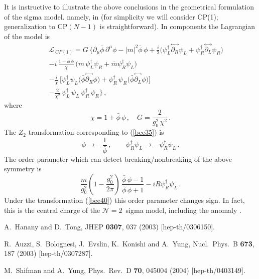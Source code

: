\documentclass[epsfig,12pt]{article}
\def\beq{\begin{equation}}
\def\eeq{\end{equation}}
\def\beqn{\begin{eqnarray}}
\def\eeqn{\end{eqnarray}}
\newcommand{\ntwo}{${\mathcal N}=2\,$}
\def\beqn{\begin{eqnarray}}
\def\eeqn{\end{eqnarray}}
\def\beq{\begin{equation}}
\def\eeq{\end{equation}}
\begin{document}
{It is instructive to illustrate the above conclusions
in  the geometrical  formulation of the sigma model. namely, in
(for simplicity we will consider CP(1); generalization to CP$(N-1)$ is straightforward).
In components the Lagrangian of the model is
\beqn
&&
{\mathcal L}_{\,  CP(1)}= G\, \Big\{
\partial_\mu \bar{\phi}\, \partial^\mu\phi -|m|^2{\bar{\phi}\,\phi} 
+\frac{i}{2}\big(\psi_L^\dagger\!\stackrel{\leftrightarrow}{\partial_R}\!\psi_L 
+ \psi_R^\dagger\!\stackrel{\leftrightarrow}{\partial_L}\!\psi_R
\big)
\nonumber\\[1mm] 
&&
-i\,\frac{1-\bar{\phi}\,\phi}{\chi} \,\big(m\,\psi_L^\dagger \psi_R + \bar m
\psi_R^\dagger \psi_L
\big)
\nonumber\\[1mm] 
&&
-\frac{i}{\chi}\,  \big[\psi_L^\dagger \psi_L
\big(\bar{\phi} \!\stackrel{\leftrightarrow}{\partial_R}\!\phi
\big)+ \psi_R^\dagger\, \psi_R
\big(\bar{\phi}\!\stackrel{\leftrightarrow}{\partial_L}\!\phi
\big)
\big]
\nonumber\\[1mm]
&&
-
\frac{2}{\chi^2}\,\psi_L^\dagger\,\psi_L \,\psi_R^\dagger\,\psi_R
\Big\}\,,
\label{Aone}
\eeqn
where 
\beq
\chi = 1+\bar{\phi}\,\phi\,,\quad G= \frac{2}{g_0^2\,\chi^2}\,.
\eeq
The $Z_2$ transformation corresponding to (\ref{bee35}) is
\beq
\phi \to -\frac{1}{\bar{\phi}}\,,\qquad \psi_R^\dagger \psi_L\to -
\psi_R^\dagger \psi_L\,.
\label{bee40}
\eeq
 The order parameter which can detect breaking/nonbreaking of the above
symmetry is
\beq
\frac{m}{g_0^2} \left(1- \frac{g_0^2}{2\pi}
\right)\, \frac{\bar{\phi}\,\phi-1}{\bar{\phi}\,\phi+1} - 
i R \psi_R^\dagger \psi_L\,.
\eeq
Under the transformation (\ref{bee40}) this order parameter changes sign.
In fact, this is  the central charge of the \ntwo
sigma model, including the anomaly  \cite{ls,ls1}.


\newpage
\vspace{2.5cm}

\small
\begin{thebibliography}{99}
\itemsep -2pt

A.~Hanany and D.~Tong,
JHEP {\bf 0307}, 037 (2003)
[hep-th/0306150].

R.~Auzzi, S.~Bolognesi, J.~Evslin, K.~Konishi and A.~Yung,
Nucl.\ Phys.\ B {\bf 673}, 187 (2003)
[hep-th/0307287].

M.~Shifman and A.~Yung,
Phys.\ Rev.\ D {\bf 70}, 045004 (2004)
[hep-th/0403149].


\end{thebibliography}}
\end{document}
